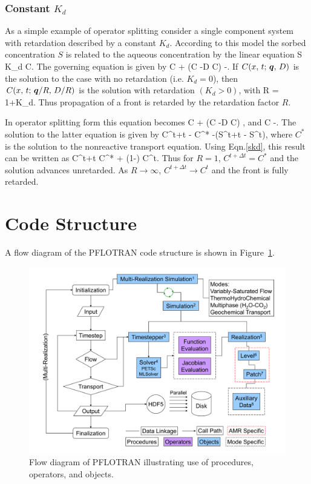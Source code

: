 \documentclass[12pt]{article}
\begin{document}
\subsubsection{Constant $K_d$}

As a simple example of operator splitting consider a single component system with retardation described by a constant $K_d$. According to this model the sorbed concentration $S$ is related to the aqueous concentration by the linear equation
\EQ\label{skd}
S \eq K_d C.
\EN
The governing equation is given by
\EQ
{} \varphi C + \bnabla\cdot\big(\bq C -\varphi D \bnabla C\big) \eq -.
\EN
If $C(x,\,t;\, \boldsymbol{q},\,D)$ is the solution to the case with no retardation (i.e. $K_d=0$), then $C(x,\,t;\, \boldsymbol{q}/R,\,D/R)$ is the solution with retardation $(K_d>0)$,
with
\EQ
R = 1+K_d.
\EN
Thus propagation of a front is retarded by the retardation factor $R$.

In operator splitting form this equation becomes
\EQ
{} \varphi C + \bnabla\cdot\big(\bq C -\varphi D \bnabla C\big) ,
\EN
and
\EQ
{} \varphi C \eq -.
\EN
The solution to the latter equation is given by
\EQ
\varphi C^{t+\Delta t} - \varphi C^* \eq -\big(S^{t+\Delta t} - S^t\big),
\EN
where $C^*$ is the solution to the nonreactive transport equation. Using Eqn.\eqref{skd}, this result can be written as
\EQ
C^{t+\Delta t} \eq {} C^* + \left(1-\right) C^t.
\EN
Thus for $R=1$, $C^{t+\Delta t}=C^*$ and the solution advances unretarded. As $R\rightarrow\infty$, $C^{t+\Delta t} \rightarrow C^t$ and the front is fully retarded.

\newpage

\section{Code Structure}

\setcounter{equation}{0}

A flow diagram of the PFLOTRAN code structure is shown in Figure~\ref{fdiag}.

\begin{figure}[h]\centering
\includegraphics[scale=0.3]{./figs/multi-realization_flowchart}
\caption{Flow diagram of PFLOTRAN illustrating use of procedures, operators, and objects.}\label{fdiag}
\end{figure}
\end{document}
